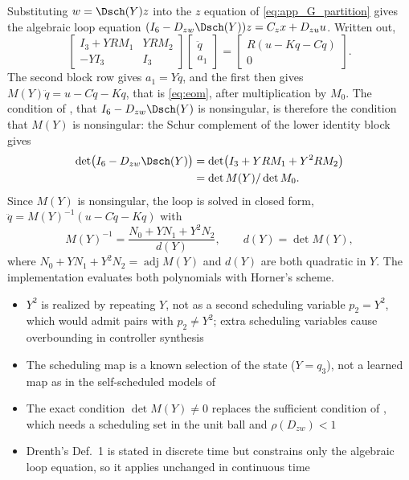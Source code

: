 Substituting $w=\Dsch(Y)z$ into the $z$ equation of
\eqref{eq:app_G_partition} gives the algebraic loop equation
$(I_6-D_{zw}\Dsch(Y))z=C_zx+D_{zu}u$. Written out,
\begin{equation*}
 \begin{bmatrix}I_3+YRM_1&YRM_2\\-YI_3&I_3\end{bmatrix}
 \begin{bmatrix}\ddot q\\a_1\end{bmatrix}
 =\begin{bmatrix}R(u-Kq-C\dot q)\\0\end{bmatrix}.
\end{equation*}
The second block row gives $a_1=Y\ddot q$, and the first then gives
$M(Y)\ddot q=u-C\dot q-Kq$, that is \eqref{eq:eom}, after multiplication by
$M_0$. The condition of
\cite[Def.~1]{drenth2025lpvlfr}, that $I_6-D_{zw}\Dsch(Y)$ is nonsingular, is
therefore the condition that $M(Y)$ is nonsingular: the Schur complement of
the lower identity block gives
\begin{equation*}
\begin{aligned}
 \det\bigl(I_6-D_{zw}\Dsch(Y)\bigr)
 &=\det\bigl(I_3+YRM_1+Y^2RM_2\bigr)\\
 &=\det M(Y)/\det M_0.
\end{aligned}
\end{equation*}
Since $M(Y)$ is nonsingular, the loop is solved in closed form,
$\ddot q=M(Y)^{-1}(u-C\dot q-Kq)$ with
\begin{equation*}
 M(Y)^{-1}=\frac{N_0+YN_1+Y^2N_2}{d(Y)},\qquad d(Y)=\det M(Y),
\end{equation*}
where $N_0+YN_1+Y^2N_2=\operatorname{adj}M(Y)$ and $d(Y)$ are both quadratic
in $Y$.
The implementation evaluates both polynomials with Horner's scheme.

\begin{itemize}
\item $Y^2$ is realized by repeating $Y$, not as a second scheduling variable $p_2=Y^2$, which would admit pairs with $p_2\neq Y^2$; extra scheduling variables cause overbounding in controller synthesis \cite{drenth2025lpvlfr}
\item The scheduling map is a known selection of the state ($Y=q_3$), not a learned map as in the self-scheduled models of \cite{drenth2025lpvlfr}
\item The exact condition $\det M(Y)\neq0$ replaces the sufficient condition of \cite[Thm.~6]{drenth2025lpvlfr}, which needs a scheduling set in the unit ball and $\rho(D_{zw})<1$
\item Drenth's Def.~1 is stated in discrete time but constrains only the algebraic loop equation, so it applies unchanged in continuous time
\end{itemize}

